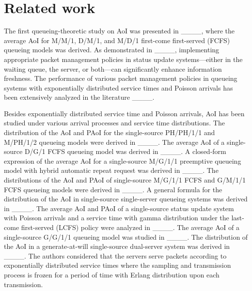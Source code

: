\section{Related work}
The first queueing-theoretic study on AoI was presented in ____, where the average AoI for M/M/1, D/M/1, and M/D/1 first-come first-served (FCFS) queueing models was derived. 
As demonstrated in ____, implementing appropriate packet management policies in status update systems—either in the waiting queue, the server, or both—can significantly enhance information freshness.
The performance of various packet management policies in queueing systems with exponentially distributed service times and Poisson arrivals has been extensively analyzed in the literature ____.


Besides exponentially distributed service time and Poisson arrivals, AoI has been studied under various arrival processes and service time distributions. 
 The distribution of the AoI and PAoI for the single-source PH/PH/1/1 and M/PH/1/2 queueing models were derived in ____.
The average AoI of a single-source D/G/1 FCFS  queueing model was derived in ____. A closed-form expression of the average AoI for a single-source  M/G/1/1 preemptive queueing model with hybrid automatic repeat request was derived in ____. The distributions of the AoI and PAoI of single-source  M/G/1/1 FCFS and G/M/1/1 FCFS queueing models were derived in ____.
A general formula for the distribution of the AoI in single-source single-server queueing systems was derived in ____. 
The average AoI and PAoI of a single-source status update system with Poisson arrivals and a service time with gamma distribution under the last-come first-served (LCFS) policy were analyzed in ____. 
The average AoI of a single-source G/G/1/1 queueing model was studied in ____. 
The distribution of the AoI in a generate-at-will single-source dual-server system was derived in ____. The authors considered that the servers serve packets according to exponentially distributed service times where the sampling and transmission process is frozen for a period of time with  Erlang distribution upon each transmission.


